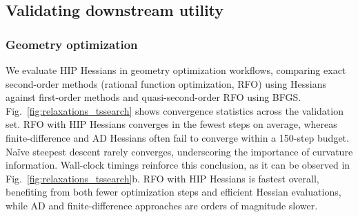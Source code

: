 \documentclass[pdflatex,sn-mathphys-num]{sn-jnl}%
\theoremstyle{thmstyleone}%
\theoremstyle{thmstyletwo}%
\theoremstyle{thmstylethree}%
\begin{document}
\subsection{Validating downstream utility}

\subsubsection{Geometry optimization}

We evaluate HIP Hessians in geometry optimization workflows, comparing exact second-order methods (rational function optimization, RFO) using Hessians against first-order methods and quasi-second-order RFO using BFGS.
Fig.~\ref{fig:relaxations_tssearch} shows convergence statistics across the validation set. RFO with HIP Hessians converges in the fewest steps on average, whereas finite-difference and AD Hessians often fail to converge within a 150-step budget. Na\"ive steepest descent rarely converges, underscoring the importance of curvature information.
Wall-clock timings reinforce this conclusion, as it can be observed in Fig.~\ref{fig:relaxations_tssearch}b. RFO with HIP Hessians is fastest overall, benefiting from both fewer optimization steps and efficient Hessian evaluations, while AD and finite-difference approaches are orders of magnitude slower.
\end{document}
